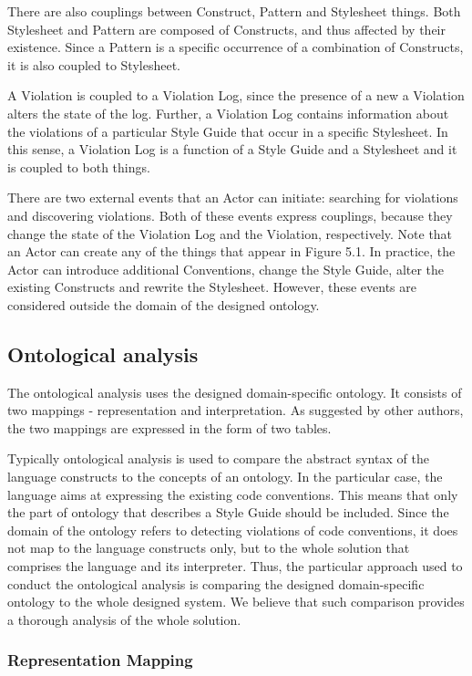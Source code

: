 \documentclass[parskip=full]{uvamscse}
\begin{document}
There are also couplings between Construct, Pattern and Stylesheet things. Both Stylesheet and
Pattern are composed of Constructs, and thus affected by their existence. Since a Pattern is a
specific occurrence of a combination of Constructs, it is also coupled to Stylesheet.

A Violation is coupled to a Violation Log, since the presence of a new a Violation alters the state
of the log. Further, a Violation Log contains information about the violations of a particular Style
Guide that occur in a specific Stylesheet. In this sense, a Violation Log is a function of a Style
Guide and a Stylesheet and it is coupled to both things.

There are two external events that an Actor can initiate: searching for violations and discovering
violations. Both of these events express couplings, because they change the state of the Violation
Log and the Violation, respectively. Note that an Actor can create any of the things that appear in
Figure 5.1. In practice, the Actor can introduce additional Conventions, change the Style Guide,
alter the existing Constructs and rewrite the Stylesheet. However, these events are considered
outside the domain of the designed ontology.

\subsection{Ontological analysis}

The ontological analysis uses the designed domain-specific ontology. It consists of two mappings -
representation and interpretation. As suggested by other authors, the two mappings are expressed in
the form of two tables. 

Typically ontological analysis is used to compare the abstract syntax of the language constructs to
the concepts of an ontology. In the particular case, the language aims at expressing the existing
code conventions. This means that only the part of ontology that describes a Style Guide should be
included. Since the domain of the ontology refers to detecting violations of code conventions, it
does not map to the language constructs only, but to the whole solution that comprises the language
and its interpreter. Thus, the particular approach used to conduct the ontological analysis is
comparing the designed domain-specific ontology to the whole designed system. We believe that such
comparison provides a thorough analysis of the whole solution.

\subsubsection{Representation Mapping} 
\end{document}
